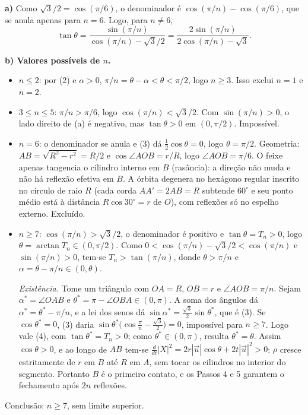 \documentclass{article}%
\begin{document}
\textbf{a)} Como $\sqrt3/2=\cos(\pi/6)$, o denominador é $\cos(\pi/n)-\cos(\pi/6)$, que se anula apenas para $n=6$. Logo, para $n\neq 6$,
\[
\tan\theta=\frac{\sin(\pi/n)}{\cos(\pi/n)-\sqrt3/2}=\frac{2\sin(\pi/n)}{2\cos(\pi/n)-\sqrt3}.
\]

\textbf{b) Valores possíveis de $n$.}
\begin{itemize}
\item $n\le 2$: por (2) e $\alpha>0$, $\pi/n=\theta-\alpha<\theta<\pi/2$, logo $n\ge 3$. Isso exclui $n=1$ e $n=2$.
\item $3\le n\le 5$: $\pi/n>\pi/6$, logo $\cos(\pi/n)<\sqrt3/2$. Com $\sin(\pi/n)>0$, o lado direito de (a) é negativo, mas $\tan\theta>0$ em $(0,\pi/2)$. Impossível.
\item $n=6$: o denominador se anula e (3) dá $\tfrac12\cos\theta=0$, logo $\theta=\pi/2$. Geometria: $AB=\sqrt{R^2-r^2}=R/2$ e $\cos\angle AOB=r/R$, logo $\angle AOB=\pi/6$. O feixe apenas tangencia o cilindro interno em $B$ (rasância): a direção não muda e não há reflexão efetiva em $B$. A órbita degenera no hexágono regular inscrito no círculo de raio $R$ (cada corda $AA'=2AB=R$ subtende $60^\circ$ e seu ponto médio está à distância $R\cos 30^\circ=r$ de $O$), com reflexões só no espelho externo. Excluído.
\item $n\ge 7$: $\cos(\pi/n)>\sqrt3/2$, o denominador é positivo e $\tan\theta=T_n>0$, logo $\theta=\arctan T_n\in(0,\pi/2)$. Como $0<\cos(\pi/n)-\sqrt3/2<\cos(\pi/n)$ e $\sin(\pi/n)>0$, tem-se $T_n>\tan(\pi/n)$, donde $\theta>\pi/n$ e $\alpha=\theta-\pi/n\in(0,\theta)$.

\emph{Existência.} Tome um triângulo com $OA=R$, $OB=r$ e $\angle AOB=\pi/n$. Sejam $\alpha^*=\angle OAB$ e $\theta^*=\pi-\angle OBA\in(0,\pi)$. A soma dos ângulos dá $\alpha^*=\theta^*-\pi/n$, e a lei dos senos dá $\sin\alpha^*=\frac{\sqrt3}{2}\sin\theta^*$, que é (3). Se $\cos\theta^*=0$, (3) daria $\sin\theta^*\big(\cos\frac{\pi}{n}-\frac{\sqrt3}{2}\big)=0$, impossível para $n\ge 7$. Logo vale (4), com $\tan\theta^*=T_n>0$; como $\theta^*\in(0,\pi)$, resulta $\theta^*=\theta$. Assim $\cos\theta>0$, e ao longo de $AB$ tem-se $\frac{d}{dt}|X|^2=2r|\vec u|\cos\theta+2t|\vec u|^2>0$: $\rho$ cresce estritamente de $r$ em $B$ até $R$ em $A$, sem tocar os cilindros no interior do segmento. Portanto $B$ é o primeiro contato, e os Passos 4 e 5 garantem o fechamento após $2n$ reflexões.
\end{itemize}
Conclusão: $n\ge 7$, sem limite superior.
\end{document}
